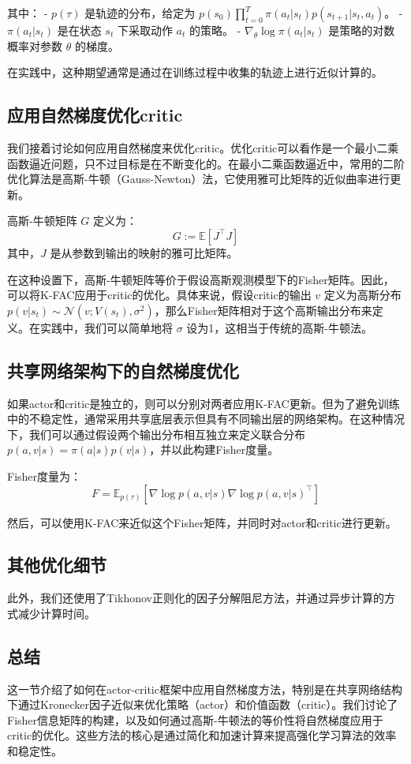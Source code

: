 \documentclass[twocolumn, 10pt]{article} %
\theoremstyle{remark}
\begin{document}
其中：
- \( p(\tau) \) 是轨迹的分布，给定为 \( p(s_0) \prod_{t=0}^{T} \pi(a_t|s_t)p(s_{t+1}|s_t, a_t) \)。
- \( \pi(a_t|s_t) \) 是在状态 \( s_t \) 下采取动作 \( a_t \) 的策略。
- \( \nabla_\theta \log \pi(a_t|s_t) \) 是策略的对数概率对参数 \( \theta \) 的梯度。

在实践中，这种期望通常是通过在训练过程中收集的轨迹上进行近似计算的。

\subsection{应用自然梯度优化critic}
我们接着讨论如何应用自然梯度来优化critic。优化critic可以看作是一个最小二乘函数逼近问题，只不过目标是在不断变化的。在最小二乘函数逼近中，常用的二阶优化算法是高斯-牛顿（Gauss-Newton）法，它使用雅可比矩阵的近似曲率进行更新。

高斯-牛顿矩阵 \( G \) 定义为：
\[
G := \mathbb{E}[J^\top J]
\]
其中，\( J \) 是从参数到输出的映射的雅可比矩阵。

在这种设置下，高斯-牛顿矩阵等价于假设高斯观测模型下的Fisher矩阵。因此，可以将K-FAC应用于critic的优化。具体来说，假设critic的输出 \( v \) 定义为高斯分布 \( p(v|s_t) \sim \mathcal{N}(v; V(s_t), \sigma^2) \)，那么Fisher矩阵相对于这个高斯输出分布来定义。在实践中，我们可以简单地将 \( \sigma \) 设为1，这相当于传统的高斯-牛顿法。

\subsection{共享网络架构下的自然梯度优化}
如果actor和critic是独立的，则可以分别对两者应用K-FAC更新。但为了避免训练中的不稳定性，通常采用共享底层表示但具有不同输出层的网络架构。在这种情况下，我们可以通过假设两个输出分布相互独立来定义联合分布 \( p(a, v|s) = \pi(a|s)p(v|s) \)，并以此构建Fisher度量。

Fisher度量为：
\[
F = \mathbb{E}_{p(\tau)}\left[\nabla \log p(a, v|s)\nabla \log p(a, v|s)^\top\right]
\]

然后，可以使用K-FAC来近似这个Fisher矩阵，并同时对actor和critic进行更新。

\subsection{其他优化细节}
此外，我们还使用了Tikhonov正则化的因子分解阻尼方法，并通过异步计算的方式减少计算时间。

\subsection{总结}
这一节介绍了如何在actor-critic框架中应用自然梯度方法，特别是在共享网络结构下通过Kronecker因子近似来优化策略（actor）和价值函数（critic）。我们讨论了Fisher信息矩阵的构建，以及如何通过高斯-牛顿法的等价性将自然梯度应用于critic的优化。这些方法的核心是通过简化和加速计算来提高强化学习算法的效率和稳定性。
\end{document}
